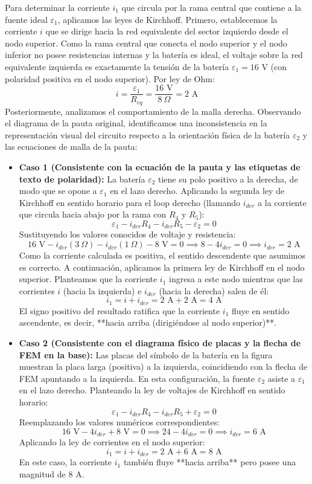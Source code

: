 \documentclass{article}
\begin{document}
Para determinar la corriente $i_1$ que circula por la rama central que contiene a la fuente ideal $\varepsilon_1$, aplicamos las leyes de Kirchhoff. Primero, establecemos la corriente $i$ que se dirige hacia la red equivalente del sector izquierdo desde el nodo superior. Como la rama central que conecta el nodo superior y el nodo inferior no posee resistencias internas y la batería es ideal, el voltaje sobre la red equivalente izquierda es exactamente la tensión de la batería $\varepsilon_1 = 16\text{ V}$ (con polaridad positiva en el nodo superior). Por ley de Ohm:
\[
i = \frac{\varepsilon_1}{R_{eq}} = \frac{16\text{ V}}{8\ \Omega} = 2\text{ A}
\]
Posteriormente, analizamos el comportamiento de la malla derecha. Observando el diagrama de la pauta original, identificamos una inconsistencia en la representación visual del circuito respecto a la orientación física de la batería $\varepsilon_2$ y las ecuaciones de malla de la pauta:
\begin{itemize}
    \item \textbf{Caso 1 (Consistente con la ecuación de la pauta y las etiquetas de texto de polaridad):} La batería $\varepsilon_2$ tiene su polo positivo a la derecha, de modo que se opone a $\varepsilon_1$ en el lazo derecho. Aplicando la segunda ley de Kirchhoff en sentido horario para el loop derecho (llamando $i_{der}$ a la corriente que circula hacia abajo por la rama con $R_4$ y $R_5$):
    \[
    \varepsilon_1 - i_{der} R_4 - i_{der} R_5 - \varepsilon_2 = 0
    \]
    Sustituyendo los valores conocidos de voltaje y resistencia:
    \[
    16\text{ V} - i_{der} (3\ \Omega) - i_{der} (1\ \Omega) - 8\text{ V} = 0 \implies 8 - 4 i_{der} = 0 \implies i_{der} = 2\text{ A}
    \]
    Como la corriente calculada es positiva, el sentido descendente que asumimos es correcto. A continuación, aplicamos la primera ley de Kirchhoff en el nodo superior. Planteamos que la corriente $i_1$ ingresa a este nodo mientras que las corrientes $i$ (hacia la izquierda) e $i_{der}$ (hacia la derecha) salen de él:
    \[
    i_1 = i + i_{der} = 2\text{ A} + 2\text{ A} = \boxed{4\text{ A}}
    \]
    El signo positivo del resultado ratifica que la corriente $i_1$ fluye en sentido ascendente, es decir, **hacia arriba (dirigiéndose al nodo superior)**.
    
    \item \textbf{Caso 2 (Consistente con el diagrama físico de placas y la flecha de FEM en la base):} Las placas del símbolo de la batería en la figura muestran la placa larga (positiva) a la izquierda, coincidiendo con la flecha de FEM apuntando a la izquierda. En esta configuración, la fuente $\varepsilon_2$ asiste a $\varepsilon_1$ en el lazo derecho. Planteando la ley de voltajes de Kirchhoff en sentido horario:
    \[
    \varepsilon_1 - i_{der} R_4 - i_{der} R_5 + \varepsilon_2 = 0
    \]
    Reemplazando los valores numéricos correspondientes:
    \[
    16\text{ V} - 4 i_{der} + 8\text{ V} = 0 \implies 24 - 4 i_{der} = 0 \implies i_{der} = 6\text{ A}
    \]
    Aplicando la ley de corrientes en el nodo superior:
    \[
    i_1 = i + i_{der} = 2\text{ A} + 6\text{ A} = \boxed{8\text{ A}}
    \]
    En este caso, la corriente $i_1$ también fluye **hacia arriba** pero posee una magnitud de $8\text{ A}$.
\end{itemize}
\end{document}
